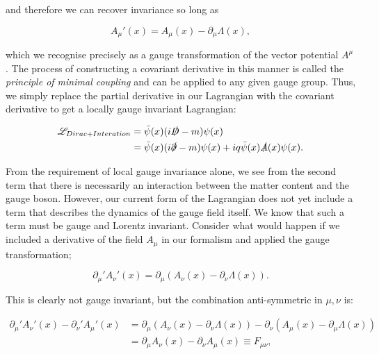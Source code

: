 and therefore we can recover invariance so long as

\begin{equation}
A_\mu'(x) = A_\mu(x) - \partial_\mu \Lambda(x),
\end{equation}

which we recognise precisely as a gauge transformation of the vector potential $A^\mu$. The process of constructing a covariant derivative in this manner is called the \emph{principle of minimal coupling} and can be applied to any given gauge group. Thus, we simply replace the partial derivative in our Lagrangian with the covariant derivative to get a locally gauge invariant Lagrangian:

\begin{equation}
\begin{split}
\mathscr{L}_{Dirac+Interation} &= \bar{\psi}(x)(i \slashed{D} - m)\psi(x) \\
& = \bar{\psi}(x)(i \slashed{\partial} -m) \psi(x) + i q \bar{\psi}(x) \slashed{A}(x) \psi(x).
\end{split}
\end{equation}

From the requirement of local gauge invariance alone, we see from the second term that there is necessarily an interaction between the matter content and the gauge boson. However, our current form of the Lagrangian does not yet include a term that describes the dynamics of the gauge field itself. We know that such a term must be gauge and Lorentz invariant. Consider what would happen if we included a derivative of the field $A_\mu$ in our formalism and applied the gauge transformation;

\begin{equation}
\partial_\mu ' A_\nu'  (x) = \partial_\mu (A_\nu(x) - \partial_\nu \Lambda(x)).
\end{equation}

This is clearly not gauge invariant, but the combination anti-symmetric in $\mu,\nu$ is:

\begin{equation}
\begin{split}
\partial_\mu ' A_\nu' (x) - \partial_\nu' A_\mu'(x) & = \partial_\mu (A_\nu(x) - \partial_\nu \Lambda(x)) -  \partial_\nu (A_\mu(x) - \partial_\mu \Lambda(x)) \\
&= \partial_\mu A_\nu (x) - \partial_\nu A_\mu(x) \equiv F_{\mu \nu}, 
\end{split}
\end{equation}

